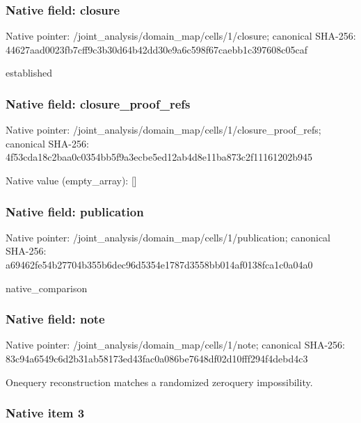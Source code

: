\documentclass[10pt,a4paper]{article}
\begin{document}
\subsubsection{Native field: closure}


Native pointer: /joint\_analysis/domain\_m\allowbreak{}ap/cells/1/closure; canonical SHA-256: 44627aad0023fb7cff9c3b30\allowbreak{}d64b42dd30e9a6c598f67cae\allowbreak{}bb1c397608c05caf


established


\subsubsection{Native field: closure\_proof\_refs}


Native pointer: /joint\_analysis/domain\_m\allowbreak{}ap/cells/1/closure\_proof\allowbreak{}\_refs; canonical SHA-256: 4f53cda18c2baa0c0354bb5f\allowbreak{}9a3ecbe5ed12ab4d8e11ba87\allowbreak{}3c2f11161202b945



Native value (empty\_array): []



\subsubsection{Native field: publication}


Native pointer: /joint\_analysis/domain\_m\allowbreak{}ap/cells/1/publication; canonical SHA-256: a69462fe54b27704b355b6de\allowbreak{}c96d5354e1787d3558bb014a\allowbreak{}f0138fca1c0a04a0


native\_comparison


\subsubsection{Native field: note}


Native pointer: /joint\_analysis/domain\_map/cells/1/note; canonical SHA-256: 83c94a6549c6d2b31ab58173\allowbreak{}ed43fac0a086be7648df02d1\allowbreak{}0fff294f4debd4c3


Onequery reconstruction matches a randomized zeroquery impossibility.


\subsubsection{Native item 3}
\end{document}

